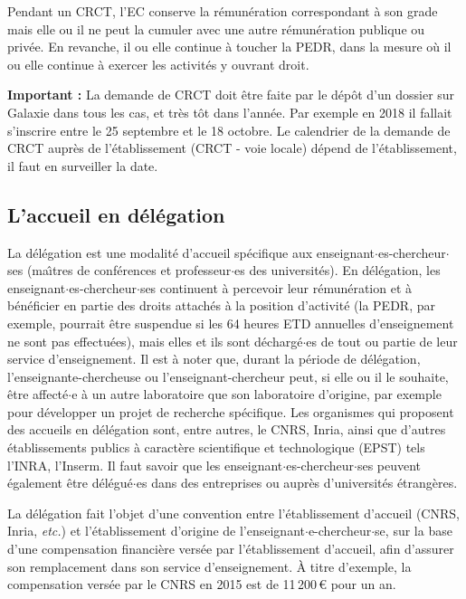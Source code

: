 Pendant un CRCT, l'EC conserve la r\'emun\'eration correspondant \`a son grade
mais elle ou il ne peut la cumuler avec une autre r\'emun\'eration publique ou priv\'ee.
En revanche, il ou elle continue \`a toucher la PEDR, dans la mesure o\`u il ou elle continue \`a exercer les activit\'es y ouvrant droit. 


\textbf{Important :} La demande de CRCT doit \^etre faite par le d\'ep\^ot d’un dossier sur Galaxie dans tous les cas, et tr\`es t\^ot dans l'ann\'ee. Par exemple en 2018 il fallait s'inscrire entre le 25 septembre et le 18 octobre. Le calendrier de la demande de CRCT aupr\`es de l’\'etablissement (CRCT - voie locale) d\'epend de l'\'etablissement, il faut en surveiller la date.

\subsection{L'accueil en d\'el\'egation}
\label{delegation}


La d\'el\'egation est une modalit\'e d'accueil sp\'ecifique aux
enseignant$\cdot$es-chercheur$\cdot$ses  (ma\^\i tres de conf\'erences et
professeur$\cdot$es des universit\'es). En d\'el\'egation, les
enseignant$\cdot$es-chercheur$\cdot$ses continuent \`a percevoir leur r\'emun\'eration
et \`a b\'en\'eficier en partie des droits attach\'es \`a la position
d'activit\'e (la PEDR, par exemple, pourrait \^etre suspendue si les 64 heures
 ETD annuelles d'enseignement ne sont pas effectu\'ees), mais elles et ils
sont d\'echarg\'e$\cdot$es de tout ou partie de leur service d'enseignement.
Il est \`a noter que, durant la p\'eriode de d\'el\'egation, l'enseignante-chercheuse ou l'enseignant-chercheur peut,
si elle ou il le souhaite, \^etre affect\'e$\cdot$e \`a un autre laboratoire
que son laboratoire d'origine, par exemple pour d\'evelopper
un projet de recherche sp\'ecifique.
Les organismes qui
proposent des accueils en d\'el\'egation sont, entre autres, le
CNRS, Inria, ainsi que d'autres \'etablis\-se\-ments publics \`a
caract\`ere scientifique et technologique (EPST) tels l'INRA,
l'Inserm. Il faut savoir que les enseignant$\cdot$es-chercheur$\cdot$ses peuvent
\'egalement \^etre d\'el\'egu\'e$\cdot$es dans des entreprises ou aupr\`es
d'universit\'es \'etrang\`eres.

La d\'el\'egation fait l'objet d'une convention entre
l'\'etablissement d'accueil (CNRS, Inria, {\em etc.}) et
l'\'etablisse\-ment d'origine de l'enseignant$\cdot$e-chercheur$\cdot$se, sur la base
d'une compensation financi\`ere vers\'ee par l'\'etablissement
d'accueil, afin d'assurer son remplacement dans son service
d'enseignement. \`A titre d'exemple, la compensation vers\'ee par le
CNRS en 2015 est de 11\,200\,\euro{} pour un an.

